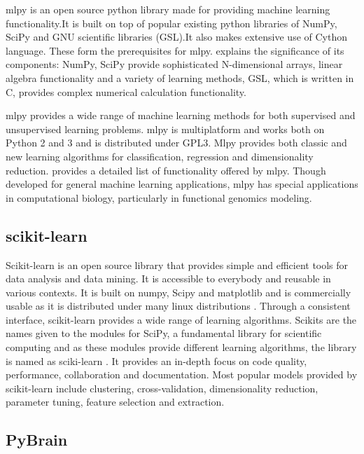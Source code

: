     mlpy is an open source python library made for providing machine
    learning functionality.It is built on top of popular existing
    python libraries of NumPy, SciPy and GNU scientific libraries
    (GSL).It also makes extensive use of Cython language. These form
    the prerequisites for
    mlpy. \cite{DBLP:journals/corr/abs-1202-6548} explains the
    significance of its components: NumPy, SciPy provide
    sophisticated N-dimensional arrays, linear algebra functionality
    and a variety of learning methods, GSL, which is written in C,
    provides complex numerical calculation functionality.

    mlpy provides a wide range of machine learning methods for both
    supervised and unsupervised learning problems. mlpy is multiplatform
    and works both on Python 2 and 3 and is distributed under GPL3. Mlpy
    provides both classic and new learning algorithms for classification,
    regression and dimensionality reduction. \cite{www-mlpy}
    provides a detailed list of functionality offered by mlpy. Though
    developed for general machine learning applications, mlpy has special
    applications in computational biology, particularly in functional
    genomics modeling.
    
\subsection{scikit-learn}

    Scikit-learn is an open source library that provides simple and
    efficient tools for data analysis and data mining. It is
    accessible to everybody and reusable in various contexts. It is
    built on numpy, Scipy and matplotlib and is commercially usable as
    it is distributed under many linux distributions
    \cite{scik1}. Through a consistent interface, scikit-learn
    provides a wide range of learning algorithms. Scikits are the
    names given to the modules for SciPy, a fundamental library for
    scientific computing and as these modules provide different
    learning algorithms, the library is named as sciki-learn
    \cite{scik2}. It provides an in-depth focus on code quality,
    performance, collaboration and documentation. Most popular models
    provided by scikit-learn include clustering, cross-validation,
    dimensionality reduction, parameter tuning, feature selection and
    extraction.

\subsection{PyBrain \cite{article-pybrain}}

